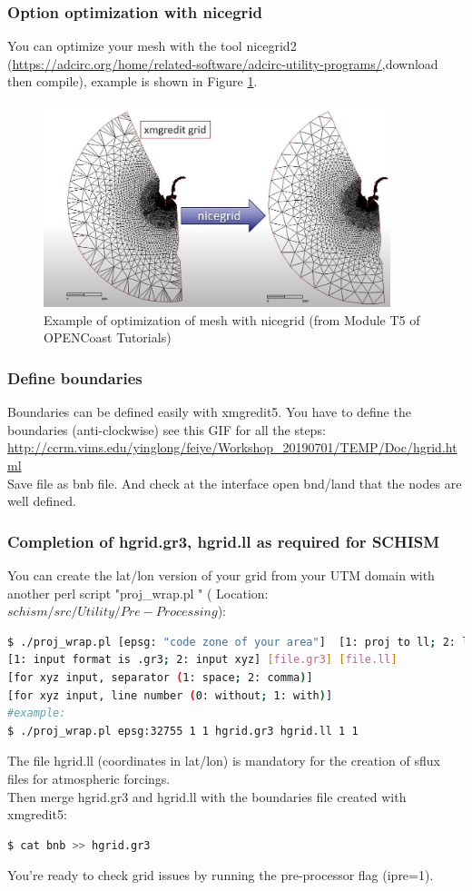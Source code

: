 \documentclass[preprints,briefreport,accept,oneauthor,pdftex]{Definitions/mdpi}
\begin{document}
\subsubsection{Option optimization with nicegrid}
You can optimize your mesh with the tool nicegrid2 (\url{https://adcirc.org/home/related-software/adcirc-utility-programs/},download then compile), example is shown in Figure \ref{fig:nicegrid}.
\begin{figure}[htbp]
    \centering
    \includegraphics[width=0.9\textwidth]{figures/nicegrid2.JPG}
    \caption{Example of optimization of mesh with nicegrid (from Module T5 of OPENCoast Tutorials)}
    \label{fig:nicegrid}
\end{figure}
\subsubsection{Define boundaries}
\noindent Boundaries can be defined easily with xmgredit5. You have to define the boundaries (anti-clockwise) see this GIF for all the steps: \\
\url{http://ccrm.vims.edu/yinglong/feiye/Workshop_20190701/TEMP/Doc/hgrid.html}\\
Save file as bnb file. And check at the interface open bnd/land that the nodes are well defined.
\subsubsection{Completion of hgrid.gr3, hgrid.ll as required for SCHISM}
\noindent You can create the lat/lon version of your grid from your UTM domain with another perl script "proj\_wrap.pl " ( Location: $schism/src/Utility/Pre-Processing$):
\begin{lstlisting}[language=bash]
$ ./proj_wrap.pl [epsg: "code zone of your area"]  [1: proj to ll; 2: ll to proj] 
[1: input format is .gr3; 2: input xyz] [file.gr3] [file.ll] 
[for xyz input, separator (1: space; 2: comma)] 
[for xyz input, line number (0: without; 1: with)]
#example:
$ ./proj_wrap.pl epsg:32755 1 1 hgrid.gr3 hgrid.ll 1 1 
\end{lstlisting}
The file hgrid.ll (coordinates in lat/lon) is mandatory for the creation of sflux files for atmospheric forcings.\\
Then merge hgrid.gr3 and hgrid.ll with the boundaries file created with xmgredit5:
\begin{lstlisting}[language=bash]
$ cat bnb >> hgrid.gr3
\end{lstlisting}
You're ready to check grid issues by running the pre-processor flag (ipre=1).
\end{document}
